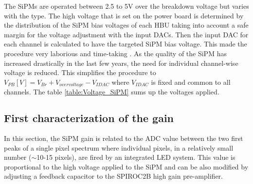 The SiPMs are operated between 2.5 to 5V over the breakdown voltage but varies with the type. The high voltage that is set on the power board is determined by the distribution of the SiPM bias voltages of each HBU taking into account a safe margin for the voltage adjustment with the input DACs. Then the input DAC for each channel is calculated to have the targeted SiPM bias voltage. This made the procedure very laborious and time-taking \cite{Hartbrich2012}. As the quality of the SiPM has increased drastically in the last few years, the need for individual channel-wise voltage is reduced. This simplifies the procedure to $V_{PB} [V] = V_{Br} + V_{overvoltage} - V_{IDAC}$ where $V_{IDAC}$ is fixed and common to all channels. The table \ref{table:Voltage_SiPM} sums up the voltages applied.

\begin{table}[htb!]
  \centering
  \caption{List of breakdown and operating voltages applied to each SiPM types. $V_{op}$ represents $V_{Br} + V_{overvoltage}$.}
  \label{table:Voltage_SiPM}
\end{table}

\subsection{First characterization of the gain}
\label{subsec:GainCharac}

In this section, the SiPM gain is related to the ADC value between the two first peaks of a single pixel spectrum where individual pixels, in a relatively small number ($\sim$10-15 pixels), are fired by an integrated LED system. This value is proportional to the high voltage applied to the SiPM and can be also modified by adjusting a feedback capacitor to the SPIROC2B high gain pre-amplifier.

